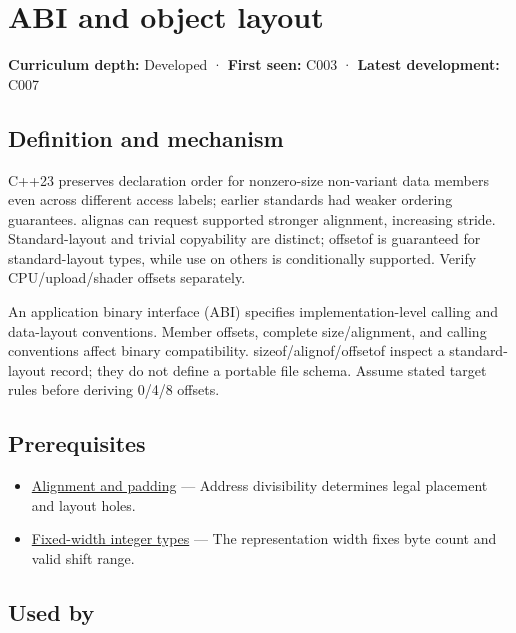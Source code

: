 \hypertarget{appendix-c4ac6bb0fff8}{}\label{referencestart:appendix-c4ac6bb0fff8}
\section{ABI and object layout}\label{appendix-c4ac6bb0fff8-abi-and-object-layout}

\textbf{Curriculum depth:} Developed · \textbf{First seen:} C003 · \textbf{Latest development:} C007

\subsection{Definition and mechanism}\label{appendix-c4ac6bb0fff8-definition-and-mechanism}

C++23 preserves declaration order for nonzero-size non-variant data members even across different access labels; earlier standards had weaker ordering guarantees. alignas can request supported stronger alignment, increasing stride. Standard-layout and trivial copyability are distinct; offsetof is guaranteed for standard-layout types, while use on others is conditionally supported. Verify CPU/upload/shader offsets separately.

An application binary interface (ABI) specifies implementation-level calling and data-layout conventions. Member offsets, complete size/alignment, and calling conventions affect binary compatibility. sizeof/alignof/offsetof inspect a standard-layout record; they do not define a portable file schema. Assume stated target rules before deriving 0/4/8 offsets.

\subsection{Prerequisites}\label{appendix-c4ac6bb0fff8-prerequisites}

\begin{itemize}
\tightlist
\item
  \hyperref[appendix-a1f7c53b4742]{Alignment and padding} --- Address divisibility determines legal placement and layout holes.
\item
  \hyperref[appendix-cc04044b5782]{Fixed-width integer types} --- The representation width fixes byte count and valid shift range.
\end{itemize}

\subsection{Used by}\label{appendix-c4ac6bb0fff8-used-by}

